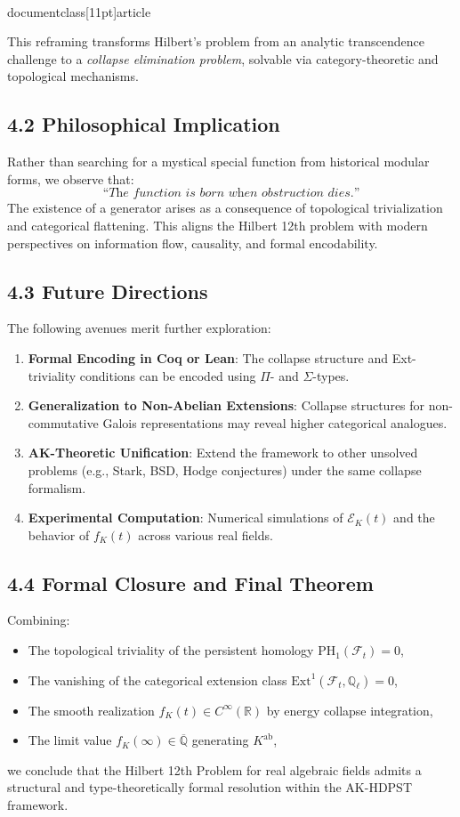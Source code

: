 \\documentclass[11pt]{article}
\begin{document}
This reframing transforms Hilbert’s problem from an analytic transcendence challenge to a \emph{collapse elimination problem}, solvable via category-theoretic and topological mechanisms.

\subsection*{4.2 Philosophical Implication}

Rather than searching for a mystical special function from historical modular forms, we observe that:
\[
\textit{“The function is born when obstruction dies.”}
\]
The existence of a generator arises as a consequence of topological trivialization and categorical flattening.  
This aligns the Hilbert 12th problem with modern perspectives on information flow, causality, and formal encodability.

\subsection*{4.3 Future Directions}

The following avenues merit further exploration:
\begin{enumerate}
    \item \textbf{Formal Encoding in Coq or Lean}: The collapse structure and Ext-triviality conditions can be encoded using \( \Pi \)- and \( \Sigma \)-types.
    \item \textbf{Generalization to Non-Abelian Extensions}: Collapse structures for non-commutative Galois representations may reveal higher categorical analogues.
    \item \textbf{AK-Theoretic Unification}: Extend the framework to other unsolved problems (e.g., Stark, BSD, Hodge conjectures) under the same collapse formalism.
    \item \textbf{Experimental Computation}: Numerical simulations of \( \mathcal{E}_K(t) \) and the behavior of \( f_K(t) \) across various real fields.
\end{enumerate}

\subsection*{4.4 Formal Closure and Final Theorem}

Combining:
\begin{itemize}
    \item The topological triviality of the persistent homology \( \mathrm{PH}_1(\mathcal{F}_t) = 0 \),
    \item The vanishing of the categorical extension class \( \mathrm{Ext}^1(\mathcal{F}_t, \mathbb{Q}_\ell) = 0 \),
    \item The smooth realization \( f_K(t) \in C^\infty(\mathbb{R}) \) by energy collapse integration,
    \item The limit value \( f_K(\infty) \in \overline{\mathbb{Q}} \) generating \( K^{\mathrm{ab}} \),
\end{itemize}
we conclude that the Hilbert 12th Problem for real algebraic fields admits a structural and type-theoretically formal resolution within the AK-HDPST framework.
\end{document}
